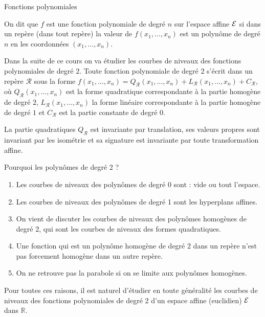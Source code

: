 \documentclass[11pt]{m53beamer}
\begin{document}
\begin{frame}{Fonctions polynomiales}
  \begin{defprop}
    On dit que $f$ est une \alert{fonction polynomiale} de degré $n$ sur l'espace affine $\mathcal{E}$ si dans un repère (dans tout repère) la valeur de $f(x_{1},\ldots,x_{n})$ est un polynôme de degré $n$ en les coordonnées $(x_{1},\ldots,x_{n})$.
  \end{defprop}\pause
  Dans la suite de ce cours on va étudier les courbes de niveaux des fonctions polynomiales de degré $2$.\pause\newline
  Toute fonction polynomiale de degré $2$ s'écrit dans un repère $\mathcal{R}$ sous la forme $f(x_{1},\ldots,x_{n})=Q_{\mathcal{R}}(x_{1},\ldots,x_{n}) + L_{\mathcal{R}}(x_{1},\ldots,x_{n}) + C_{\mathcal{R}}$\pause, où $Q_{\mathcal{R}}(x_{1},\ldots,x_{n})$ est la forme quadratique correspondante à la partie homogène de degré $2$\pause, $L_{\mathcal{R}}(x_{1},\ldots,x_{n})$ la forme linéaire correspondante à la partie homogène de degré $1$\pause{} et $C_{\mathcal{R}}$ est la partie constante de degré $0$.\pause
  \begin{proposition}
    La partie quadratiques $Q_{\mathcal{R}}$ est invariante par translation\pause, ses valeurs propres sont invariant par les isométrie\pause{} et sa signature est invariante par toute transformation affine.
  \end{proposition}
\end{frame}

\begin{frame}{Pourquoi les polynômes de degré 2 ?}
  \begin{enumerate}[<+(1)->]
    \item Les courbes de niveaux des polynômes de degré 0 sont : vide ou tout l'espace.
    \item Les courbes de niveaux des polynômes de degré 1 sont les hyperplans affines.
    \item On vient de discuter les courbes de niveaux des polynômes homogènes de degré 2, qui sont les courbes de niveaux des formes quadratiques.
    \item Une fonction qui est un polynôme homogène de degré 2 dans un repère n'est pas forcement homogène dans un autre repère.
    \item On ne retrouve pas la parabole si on se limite aux polynômes homogènes.
  \end{enumerate}\pause
  Pour toutes ces raisons, il est naturel d'étudier en toute généralité les courbes de niveaux des fonctions polynomiales de degré 2 d'un espace affine (euclidien) $\mathcal{E}$ dans $\mathbb{R}$.
\end{frame}
\end{document}

